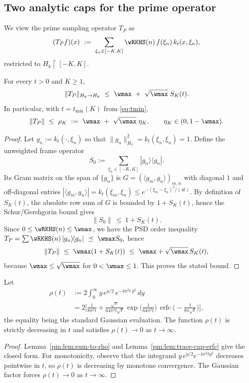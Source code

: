 \subsection*{Two analytic caps for the prime operator}

We view the prime sampling operator $T_P$ as
\[
(T_P f)(x)\ :=\ \sum_{\xi_n\in[-K,K]} \wRKHS(n)\, f(\xi_n)\, k_t(x,\xi_n),
\]
restricted to $H_k\!\restriction[-K,K]$.

\begin{proposition}\label{prop:rkhs-gram-cap}
For every $t>0$ and $K\ge1$,
\[
\|T_P\|_{H_k\to H_k}\ \le\ \wmax\ +\ \sqrt{\wmax}\; S_K(t).
\]
In particular, with $t=t_{\min}(K)$ from \eqref{eq:tmin},
\begin{equation}\label{eq:rhoK-eta}
\|T_P\|\ \le\ \rho_K\ :=\ \wmax\ +\ \sqrt{\wmax}\;\eta_K,
\qquad \eta_K\in(0,1-\wmax).
\end{equation}
\end{proposition}

\begin{proof}
Let $g_n:=k_t(\cdot,\xi_n)$ so that $\|g_n\|_{H_k}^2=k_t(\xi_n,\xi_n)=1$. Define the unweighted frame operator
\[
S_0:=\sum_{\xi_n\in[-K,K]} |g_n\rangle\!\langle g_n|.
\]
Its Gram matrix on the span of $\{g_n\}$ is $G=(\langle g_m,g_n\rangle)_{m,n}$ with diagonal $1$ and off-diagonal entries
$|\langle g_m,g_n\rangle|=k_t(\xi_m,\xi_n)\le e^{-(\xi_m-\xi_n)^2/(4t)}$. By definition of $S_K(t)$,
the absolute row sum of $G$ is bounded by $1+S_K(t)$, hence the Schur/Gershgorin bound gives
\[
\|S_0\|\ \le\ 1+S_K(t).
\]
Since $0\le \wRKHS(n)\le \wmax$, we have the PSD order inequality
\(
T_P=\sum \wRKHS(n)\,|g_n\rangle\!\langle g_n|\ \preceq\ \wmax S_0,
\)
hence
\[
\|T_P\|\ \le\ \wmax(1+S_K(t))
\ \le\ \wmax+\sqrt{\wmax}\,S_K(t),
\]
because $\wmax\le\sqrt{\wmax}$ for $0<\wmax\le1$. This proves the stated bound.
\end{proof}

\begin{lemma}\label{lem:rkhs-uniform-cap-full}\label{lem:prime-cap-uniform}
Let
\[
\begin{aligned}
  \rho(t) &:= 2\int_{0}^{\infty} y\,e^{y/2}\,e^{-4\pi^2 t\,y^2}\,dy \\
          &= 2\Bigg[\frac{1}{8\pi^2 t}
              + \frac{\sqrt{\pi}}{64\pi^3 t\sqrt{t}}\,
                \exp\!\Big(\frac{1}{64\pi^2 t}\Big)\,
                \operatorname{erfc}\!\Big(-\frac{1}{8\pi\sqrt{t}}\Big)\Bigg],
\end{aligned}
\]
the equality being the standard Gaussian evaluation. The function $\rho(t)$ is strictly decreasing in $t$ and
satisfies $\rho(t)\to0$ as $t\to\infty$.
\end{lemma}
\begin{proof}
Lemma~\ref{pm:lem:sum-to-rho} and Lemma~\ref{pm:lem:trace-cap-erfc} give the closed form.
For monotonicity, observe that the integrand $y\,e^{y/2}e^{-4\pi^2 t y^2}$ decreases pointwise in $t$,
so $\rho(t)$ is decreasing by monotone convergence. The Gaussian factor forces $\rho(t)\to0$ as $t\to\infty$.
\end{proof}


